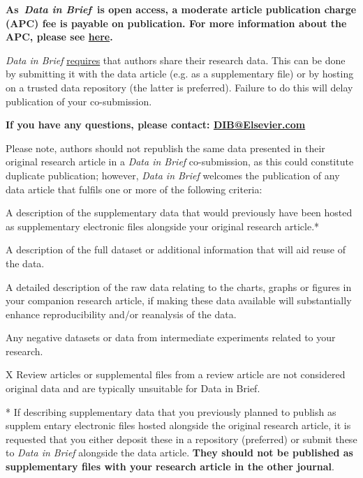 \documentclass[times,final]{elsarticle}
\begin{document}
\vskip6pt\noindent
\textbf{As~\textit{Data in Brief}~is open access, a moderate article publication charge
(APC) fee is payable on publication. For more information about the
APC, please see
\href{https://www.elsevier.com/journals/data-in-brief/2352-3409/open-access-journal}%
{here}.}

\vskip6pt\noindent
\textit{Data in Brief} \underline{requires} that authors share their research data. This can
be done by submitting it with the data article (e.g. as a supplementary
file) or by hosting on a trusted data repository (the latter is
preferred). Failure to do this will delay publication of your
co-submission.

\vskip6pt\noindent
\textbf{If you have any questions, please contact:
\href{mailto:DIB@Elsevier.com}{DIB@Elsevier.com}}

\vskip6pt\noindent
Please note, authors should not republish the same data presented in
their original research article in a \textit{Data in Brief} co-submission, as
this could constitute duplicate publication; however, \textit{Data in Brief}
welcomes the publication of any data article that fulfils one or more
of the following criteria:

\checkmark A description of the supplementary data that would
previously have been hosted as supplementary electronic files alongside
your original research article.*

\checkmark A description of the full dataset or additional information
that will aid reuse of the data.

\checkmark A detailed description of the raw data relating to the
charts, graphs or figures in your companion research article, if making
these data available will substantially enhance reproducibility and/or
reanalysis of the data.

\checkmark Any negative datasets or data from intermediate experiments
related to your research.

\textsf{X} Review articles or supplemental files from a review article
are not considered original data and are typically unsuitable for Data
in Brief.

\vskip12pt\noindent
* If describing supplementary data that you previously planned to
publish as supplem
entary electronic files hosted alongside the original
research article, it is requested that you either\break
deposit these in a
repository (preferred) or submit these to \textit{Data in Brief} alongside the
data article. \textbf{They should not be published as supplementary files with
your research article in the other journal}.
\end{document}
